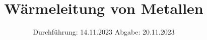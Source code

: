 


\subject{V204}
\title{Wärmeleitung von Metallen}
\date{%
  Durchführung: 14.11.2023
  \hspace{3em}
  Abgabe: 20.11.2023
}



\maketitle
\thispagestyle{empty}
\tableofcontents
\newpage




%

\printbibliography{}


